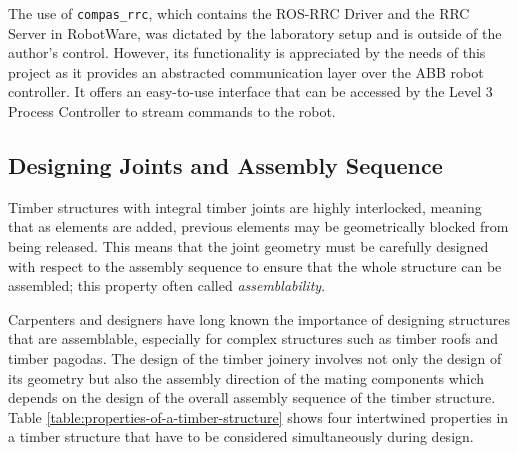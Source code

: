 The use of \verb|compas_rrc|, which contains the ROS-RRC Driver and the RRC Server in RobotWare, was dictated by the laboratory setup and is outside of the author’s control. However, its functionality is appreciated by the needs of this project as it provides an abstracted communication layer over the ABB robot controller. It offers an easy-to-use interface that can be accessed by the Level 3 Process Controller to stream commands to the robot.

\subsection{Designing Joints and Assembly Sequence}
\label{subsection:exploration-2-designing-joints-and-assembly-sequence}

Timber structures with integral timber joints are highly interlocked, meaning that as elements are added, previous elements may be geometrically blocked from being released. \parencite{wangStateArtComputational2021} This means that the joint geometry must be carefully designed with respect to the assembly sequence to ensure that the whole structure can be assembled; this property often called \textit{assemblability}. 

Carpenters and designers have long known the importance of designing structures that are assemblable, especially for complex structures such as timber roofs and timber pagodas. The design of the timber joinery involves not only the design of its geometry but also the assembly direction of the mating components which depends on the design of the overall assembly sequence of the timber structure. Table \ref{table:properties-of-a-timber-structure} shows four intertwined properties in a timber structure that have to be considered simultaneously during design.

